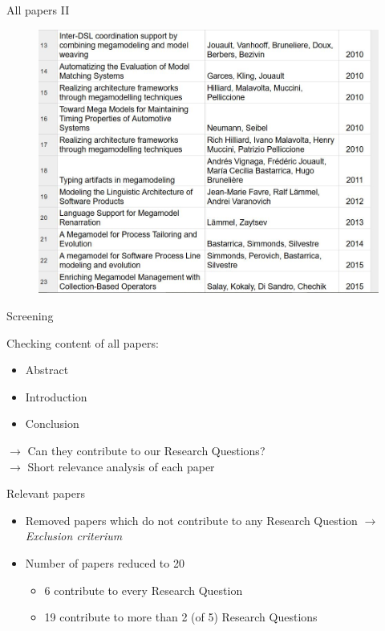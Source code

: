 \documentclass{beamer}
\begin{document}
\begin{frame}{All papers II}
\begin{figure}
	\includegraphics[width=1.0\textwidth]{all_papers_2}
\end{figure}
\end{frame}

\begin{frame}{Screening}
\begin{block}{Checking content of all papers:}
\begin{itemize}
	\item Abstract
	\item Introduction
	\item Conclusion
\end{itemize}
\end{block}
\vspace{1cm}
\large{$\rightarrow$ Can they contribute to our Research} Questions?\\
\large{$\rightarrow$ Short relevance analysis of each paper}
\end{frame}

\begin{frame}{Relevant papers}
\begin{itemize}
	\item Removed papers which do not contribute to any Research Question $\rightarrow$ \textit{Exclusion criterium}
	\item Number of papers reduced to 20
	\begin{itemize}
		\item 6 contribute to every Research Question
		\item 19 contribute to more than 2 (of 5) Research Questions
	\end{itemize}
\end{itemize}

\end{frame}
\end{document}
